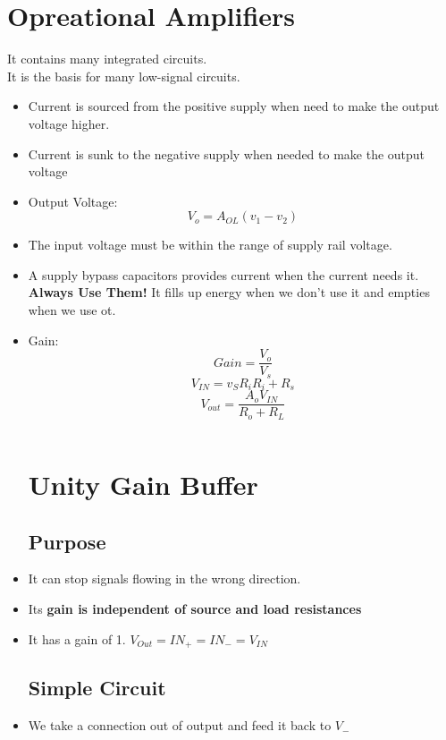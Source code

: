 \documentclass[12pt]{article}
\begin{document}
\section{Opreational Amplifiers}
It contains many integrated circuits.\\
It is the basis for many low-signal circuits.

\begin{itemize}
\item  Current is sourced from the positive supply when need to make the output voltage higher.
\item Current is sunk to the negative supply when needed to make the output voltage
\item Output Voltage:
\begin{displaymath}
V_o=A_{OL}(v_1-v_2)
\end{displaymath}
\item The input voltage must be within the range of supply rail voltage.
\item A supply bypass capacitors provides current when the current needs it. \textbf{Always Use Them!} It fills up energy when we don't use it and empties when we use ot.
\item Gain:
\begin{displaymath}
Gain=\frac{V_o}{V_s}
\end{displaymath}
\begin{displaymath}
V_{IN}=v_S{R_i}{R_i+R_s}
\end{displaymath}
\begin{displaymath}
V_{out}=\frac{A_oV_{IN}}{R_o+R_L}
\end{displaymath}

\begin{displaymath}
\end{displaymath}
\pagebreak
\section{Unity Gain Buffer}
\subsection{Purpose}
\item It can stop signals flowing in the wrong direction.
\item Its \textbf{gain is independent of source and load resistances}
\item It has a gain of 1. $V_{Out}=IN_+=IN_-=V_{IN}$
\subsection{Simple Circuit}
\item We take a connection out of output and feed it back to $V_-$

\end{itemize}
\end{document}

